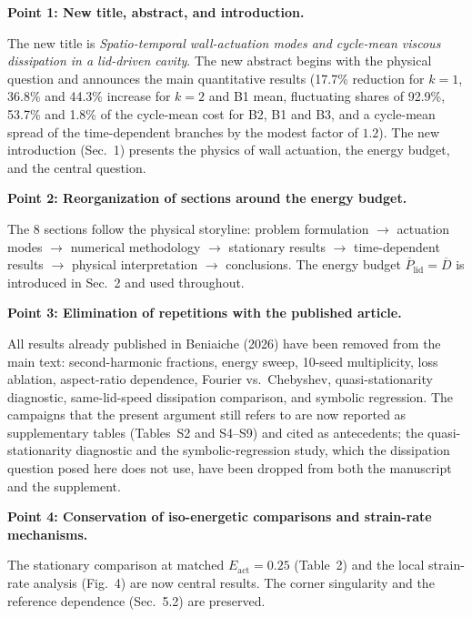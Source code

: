 \documentclass[11pt,a4paper]{article}
\begin{document}
\vspace{1em}

\noindent\textbf{Point 1: New title, abstract, and introduction.}

The new title is \textit{Spatio-temporal wall-actuation modes and cycle-mean
viscous dissipation in a lid-driven cavity}. The new abstract begins with the
physical question and announces the main quantitative results (17.7\% reduction
for $k=1$, 36.8\% and 44.3\% increase for $k=2$ and B1 mean, fluctuating shares
of 92.9\%, 53.7\% and 1.8\% of the cycle-mean cost for B2, B1 and B3, and a
cycle-mean spread of the time-dependent branches by the modest factor of $1.2$).
The new introduction (Sec.~1) presents the physics of
wall actuation, the energy budget, and the central question.

\vspace{0.5em}

\noindent\textbf{Point 2: Reorganization of sections around the energy budget.}

The 8 sections follow the physical storyline: problem formulation $\to$
actuation modes $\to$ numerical methodology $\to$ stationary results $\to$
time-dependent results $\to$ physical interpretation $\to$ conclusions. The
energy budget $\overline{P}_{\mathrm{lid}} = \overline{D}$ is introduced in
Sec.~2 and used throughout.

\vspace{0.5em}

\noindent\textbf{Point 3: Elimination of repetitions with the published article.}

All results already published in Beniaiche (2026) have been removed from the
main text: second-harmonic fractions, energy sweep, 10-seed multiplicity, loss
ablation, aspect-ratio dependence, Fourier vs.\ Chebyshev, quasi-stationarity
diagnostic, same-lid-speed dissipation comparison, and symbolic regression.
The campaigns that the present argument still refers to are now reported as
supplementary tables (Tables~S2 and S4--S9) and cited as antecedents; the
quasi-stationarity diagnostic and the symbolic-regression study, which the
dissipation question posed here does not use, have been dropped from both the
manuscript and the supplement.

\vspace{0.5em}

\noindent\textbf{Point 4: Conservation of iso-energetic comparisons and
strain-rate mechanisms.}

The stationary comparison at matched $E_{\mathrm{act}} = 0.25$ (Table~2) and the
local strain-rate analysis (Fig.~4) are now central results. The corner
singularity and the reference dependence (Sec.~5.2) are preserved.
\end{document}
